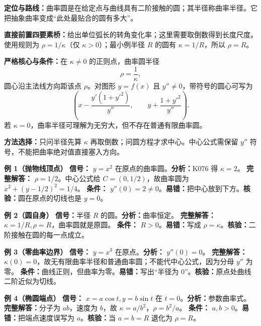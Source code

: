 
\par

\begin{knowledgeBox}
\textbf{定位与路线：}曲率圆是在给定点与曲线具有二阶接触的圆；其半径称曲率半径。它把抽象曲率变成“此处最贴合的圆有多大”。

\textbf{直接前置四要素桥：}给出单位弧长的转角变化率；这里需要取倒数得到长度尺度。使用规则为 \(\rho=1/\kappa\)（仅 \(\kappa>0\)）；最小例半径 \(R\) 的圆有 \(\kappa=1/R\)，所以 \(\rho=R\)。

\textbf{严格核心与条件：}在 \(\kappa\ne0\) 的正则点，曲率圆半径
\[
\rho=\frac1\kappa,
\]
圆心沿主法线方向距该点 \(\rho\)。对图形 \(y=f(x)\) 且 \(y''\ne0\)，带符号的圆心可写为
\[
\left(x-\frac{y'(1+y'^2)}{y''},\qquad
y+\frac{1+y'^2}{y''}\right).
\]
若 \(\kappa=0\)，曲率半径可理解为无穷大，但不存在普通有限曲率圆。

\textbf{方法选择：}只问半径先算 \(\kappa\) 再取倒数；问圆方程才求中心。中心公式需保留 \(y''\) 符号，不能把曲率绝对值直接塞入方向。

\textbf{例 1（抛物线顶点）}\quad
\textbf{信号：} \(y=x^2\) 在原点的曲率圆。\textbf{分析：}K076 得 \(\kappa=2\)。
\textbf{完整解答：} \(\rho=1/2\)。中心公式给 \(C=(0,1/2)\)，故曲率圆为 \(x^2+(y-1/2)^2=1/4\)。
\textbf{条件：} \(y''(0)=2\ne0\)。\textbf{易错：}把中心放到下方。\textbf{核验：}圆在原点的切线也是 \(y=0\)。

\textbf{例 2（圆自身）}\quad
\textbf{信号：}半径 \(R\) 的圆。\textbf{分析：}曲率恒定。
\textbf{完整解答：}\(\kappa=1/R,\rho=R\)，曲率圆就是原圆。
\textbf{条件：} \(R>0\)。\textbf{易错：}写成 \(\rho=\kappa\)。\textbf{核验：}二阶接触在圆的每一点成立。

\textbf{例 3（零曲率边界）}\quad
\textbf{信号：} \(y=x^3\) 在原点。\textbf{分析：} \(y''(0)=0\)。
\textbf{完整解答：}\(\kappa(0)=0\)，故无有限曲率半径和普通曲率圆；不能代中心公式，因为分母 \(y''\) 为零。
\textbf{条件：}曲线正则，但曲率为零。\textbf{易错：}写出“半径为 \(0\)”。\textbf{核验：}原点处曲线二阶近似为切线。

\textbf{例 4（椭圆端点）}\quad
\textbf{信号：} \(x=a\cos t,y=b\sin t\) 在 \(t=0\)。\textbf{分析：}参数曲率式。
\textbf{完整解答：}分子为 \(ab\)，速度为 \(b\)，故 \(\kappa=a/b^2\)，\(\rho=b^2/a\)。
\textbf{条件：} \(a,b>0\)。\textbf{易错：}把端点速度误写为 \(a\)。\textbf{核验：}当 \(a=b=R\) 退化为 \(\rho=R\)。


\end{knowledgeBox}
